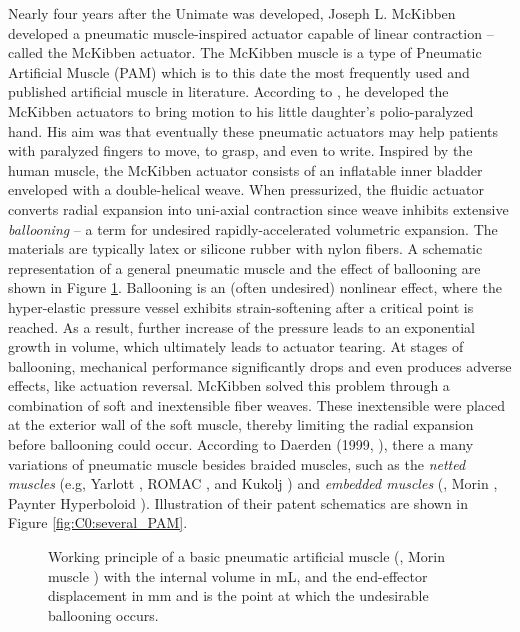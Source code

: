 Nearly four years after the Unimate was developed, Joseph L. McKibben developed a pneumatic muscle-inspired actuator capable of linear contraction -- called the McKibben actuator. The McKibben muscle is a type of Pneumatic Artificial Muscle (PAM) which is to this date the most frequently used and published artificial muscle in literature. According to \cite{Mckibben}, he developed the McKibben actuators to bring motion to his little daughter's polio-paralyzed hand. His aim was that eventually these pneumatic actuators may help patients with paralyzed fingers to move, to grasp, and even to write. Inspired by the human muscle, the McKibben actuator consists of an inflatable inner bladder enveloped with a double-helical weave. When pressurized, the fluidic actuator converts radial expansion into uni-axial contraction \cite{Daerden1999,Daerden2000,Schulte1961} since weave inhibits extensive \emph{ballooning} -- a term for undesired rapidly-accelerated volumetric expansion. The materials are typically latex or silicone rubber with nylon fibers. A schematic representation of a general pneumatic muscle and the effect of ballooning are shown in Figure \ref{fig:C0:mckibben}. Ballooning is an (often undesired) nonlinear effect, where the hyper-elastic pressure vessel exhibits strain-softening after a critical point is reached. As a result, further increase of the pressure leads to an exponential growth in volume, which ultimately leads to actuator tearing. At stages of ballooning, mechanical performance significantly drops and even produces adverse effects, like actuation reversal. McKibben solved this problem through a combination of soft and inextensible fiber weaves. These inextensible were placed at the exterior wall of the soft muscle, thereby limiting the radial expansion before ballooning could occur. According to Daerden (1999, \cite{Daerden1999}), there a many variations of pneumatic muscle besides braided muscles, such as the \emph{netted muscles} (e.g, Yarlott \cite{Yarlott1972}, ROMAC \cite{Immega1986}, and Kukolj \cite{Kukolj1988}) and \emph{embedded muscles} (\eg, Morin \cite{Morin1953}, Paynter Hyperboloid \cite{Paynter1988}). Illustration of their patent schematics are shown in Figure \ref{fig:C0:several_PAM}.

\begin{figure}[!t]
  \ifx\printFigures\undefined
  \else
  \centering
  
  \fi
  \vspace{-3mm}
  \caption{Working principle of a basic pneumatic artificial muscle (\ie, Morin muscle \cite{Morin1953}) with the internal volume  in \si{\milli \liter}, and the end-effector displacement  in \si{\milli \meter} and  is the point at which the undesirable ballooning occurs.
  \label{fig:C0:mckibben}}
\end{figure}

